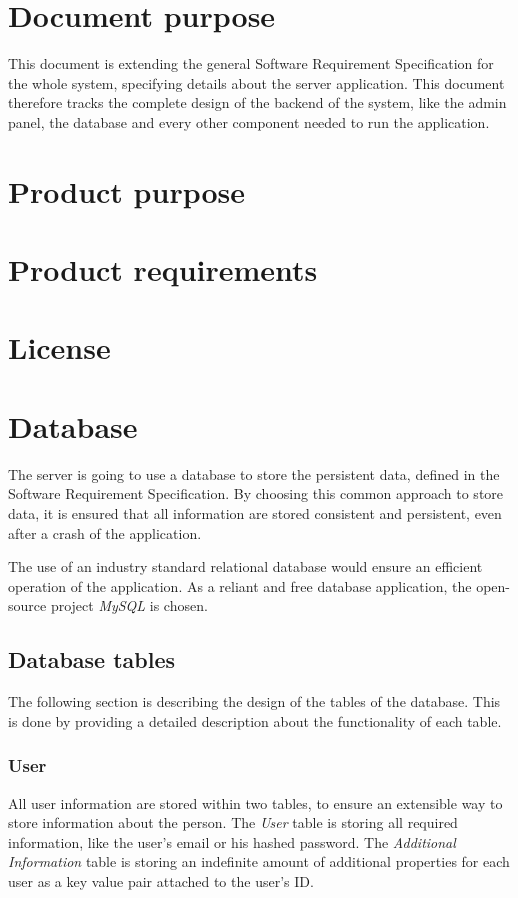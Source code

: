 \pagestyle{fancy}
\lhead{}
\renewcommand{\headrulewidth}{0pt}
\setlength{\headheight}{14pt}

\chapter{Document purpose}
This document is extending the general Software Requirement Specification for the whole system, specifying details about the server application. This document therefore tracks the complete design of the backend of the system, like the admin panel, the database and every other component needed to run the application.

\chapter{Product purpose}

\chapter{Product requirements}

\chapter{License}

\chapter{Database}
The server is going to use a database to store the persistent data, defined in the Software Requirement Specification. By choosing this common approach to store data, it is ensured that all information are stored consistent and persistent, even after a crash of the application.

The use of an industry standard relational database would ensure an efficient operation of the application. As a reliant and free database application, the open-source project \emph{MySQL} is chosen.

\section{Database tables}
The following section is describing the design of the tables of the database. This is done by providing a detailed description about the functionality of each table.

\subsection{User}
All user information are stored within two tables, to ensure an extensible way to store information about the person. The \emph{User} table is storing all required information, like the user's email or his hashed password. The \emph{Additional Information} table is storing an indefinite amount of additional properties for each user as a key value pair attached to the user's ID.

